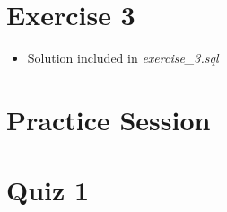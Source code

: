 \documentclass[12pt]{article}
\begin{document}
\bigskip

\section{Exercise 3}

\bigskip

\begin{itemize}
    \item Solution included in \textit{exercise\_3.sql}
\end{itemize}

\bigskip

\section{Practice Session}



\bigskip

\section{Quiz 1}

\bigskip
\end{document}
